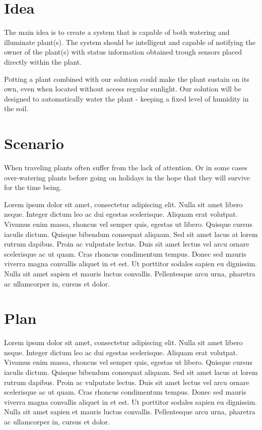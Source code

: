 \documentclass{ubicomp2012}
\begin{document}
\section{Idea}
The main idea is to create a system that is capable of both watering and illuminate plant(s). The system should be intelligent and capable of notifying the owner of the plant(s) with status information obtained trough sensors placed directly within the plant.

Potting a plant combined with our solution could make the plant sustain on its own, even when located without access regular sunlight. Our solution will be designed to automatically water the plant - keeping a fixed level of humidity in the soil.

\section{Scenario}
When traveling plants often suffer from the lack of attention. Or in some cases over-watering plants before going on holidays in the hope that they will survive for the time being.

Lorem ipsum dolor sit amet, consectetur adipiscing elit. Nulla sit amet libero neque. Integer dictum leo ac dui egestas scelerisque. Aliquam erat volutpat. Vivamus enim massa, rhoncus vel semper quis, egestas ut libero. Quisque cursus iaculis dictum. Quisque bibendum consequat aliquam. Sed sit amet lacus at lorem rutrum dapibus. Proin ac vulputate lectus. Duis sit amet lectus vel arcu ornare scelerisque ac ut quam. Cras rhoncus condimentum tempus. Donec sed mauris viverra magna convallis aliquet in et est. Ut porttitor sodales sapien eu dignissim. Nulla sit amet sapien et mauris luctus convallis. Pellentesque arcu urna, pharetra ac ullamcorper in, cursus et dolor.

\section{Plan}
Lorem ipsum dolor sit amet, consectetur adipiscing elit. Nulla sit amet libero neque. Integer dictum leo ac dui egestas scelerisque. Aliquam erat volutpat. Vivamus enim massa, rhoncus vel semper quis, egestas ut libero. Quisque cursus iaculis dictum. Quisque bibendum consequat aliquam. Sed sit amet lacus at lorem rutrum dapibus. Proin ac vulputate lectus. Duis sit amet lectus vel arcu ornare scelerisque ac ut quam. Cras rhoncus condimentum tempus. Donec sed mauris viverra magna convallis aliquet in et est. Ut porttitor sodales sapien eu dignissim. Nulla sit amet sapien et mauris luctus convallis. Pellentesque arcu urna, pharetra ac ullamcorper in, cursus et dolor.
\end{document}
